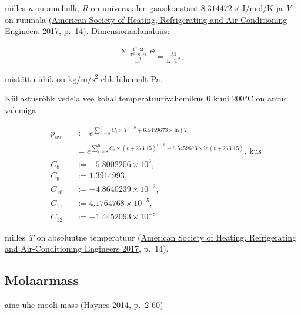 \documentclass[
  12pt,
  a4paper,
  onecolumn, twoside]{article}
\providecommand{\tightlist}{%
  \setlength{\itemsep}{0pt}\setlength{\parskip}{0pt}}
\begin{document}
milles \emph{n} on ainehulk, \emph{R} on universaalne gaasikonstant \(8.314472 \times \unit{\joule\per\mole\per\kelvin}\) ja \emph{V} on ruumala (\protect\hyperlink{ref-American_Society_of_Heating_Refrigerating_and_Air-Conditioning_Engineers2017-im}{American Society of Heating, Refrigerating and Air-Conditioning Engineers 2017}, p.~14). Dimensionaalanalüüs:

\begin{align}
\frac{\mathrm{N} \cdot \frac{\mathrm{L^2 \cdot M}}{\mathrm{T^2 \cdot N} \cdot \Theta} \cdot \Theta}{\mathrm{L^3}} = \mathrm{\frac{M}{L \cdot T^2}},
\label{eq:dimensional-analysis-for-pressure-of-ideal-gas}
\end{align}

mistõttu ühik on \(\unit{\kilogram\per\meter\per\second\squared}\) ehk lühemalt \(\unit{\pascal}\).

Küllastusrõhk vedela vee kohal temperatuurivahemikus 0 kuni 200°C on antud valemiga

\begin{align}
& p_{ws} && := e^{\sum_{i := 8}^{n}{C_i \times T^{i - 9}} + 6.5459673 \times \mathrm{ln}(T)}\\
&&&= e^{\sum_{i := 8}^n{C_i \times (t + 273.15)^{i - 9}} + 6.5459673 \times \mathrm{ln}(t + 273.15)}\text{, kus}\\
& C_8 && := -5.8002206 \times 10^3,\\
& C_9 && := 1.3914993,\\
& C_{10} && := -4.8640239 \times 10^{-2},\\
& C_{11} && := 4.1764768 \times 10^{-5},\\
& C_{12} && := -1.4452093 \times 10^{-8}
\label{eq:saturation-pressure-over-liquid-h2o}
\end{align}

milles \emph{T} on absoluutne temperatuur (\protect\hyperlink{ref-American_Society_of_Heating_Refrigerating_and_Air-Conditioning_Engineers2017-im}{American Society of Heating, Refrigerating and Air-Conditioning Engineers 2017}, p.~14).

\hypertarget{molaarmass}{%
\subsection{Molaarmass}\label{molaarmass}}

\begin{description}
\tightlist
\item[molaarmass]
aine ühe mooli mass (\protect\hyperlink{ref-haynes_2014_crc}{Haynes 2014}, p.~2-60)
\end{description}
\end{document}
